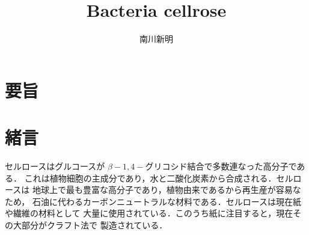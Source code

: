 \documentclass[uplatex, dvipdfmx, 10pt]{jarticle}
\title{{\huge Bacteria cellrose}}
\author{南川新明}
\begin{document}
        
            \begin{titlepage}
                \begin{center}

                    \vspace{10truept}


                    \vspace*{180truept}


                    \vspace{100truept}
                    

                    \vspace{10truept}


                    \vspace{70truept}
                    

                    \vspace{10truept}

                \end{center}
            \end{titlepage}
        
        \section*{要旨}

        \section*{緒言}
            
            セルロースはグルコースが $\beta-1,4-$グリコシド結合で多数連なった高分子である．
            これは植物細胞の主成分であり，水と二酸化炭素から合成される．セルロースは
            地球上で最も豊富な高分子であり，植物由来であるから再生産が容易なため，
            石油に代わるカーボンニュートラルな材料である．セルロースは現在紙や繊維の材料として
            大量に使用されている．このうち紙に注目すると，現在その大部分がクラフト法で
            製造されている．
\end{document}
